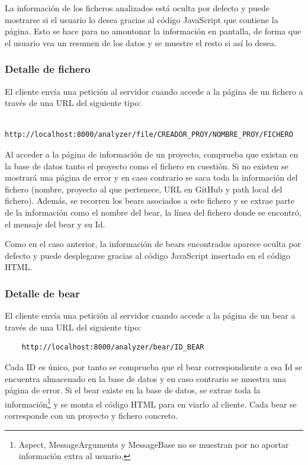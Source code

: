 \documentclass[a4paper, 12pt]{book}
\begin{document}
La información de los ficheros analizados está oculta por defecto y puede mostrarse si el usuario lo desea gracias al código JavaScript que contiene la página. Esto se hace para no amontonar la información en pantalla, de forma que el usuario vea un resumen de los datos y se muestre el resto si así lo desea.

\subsubsection{Detalle de fichero}
\label{sec:section12.4.2}
El cliente envía una petición al servidor cuando accede a la página de un fichero a través de una URL del siguiente tipo:

{\footnotesize
\begin{verbatim}
    http://localhost:8000/analyzer/file/CREADOR_PROY/NOMBRE_PROY/FICHERO
\end{verbatim}
}

Al acceder a la página de información de un proyecto, comprueba que existan en la base de datos tanto el proyecto como el fichero en cuestión. Si no existen se mostrará una página de error y en caso contrario se saca toda la información del fichero (nombre, proyecto al que pertenece, URL en GitHub y path local del fichero). Además, se recorren los bears asociados a este fichero y se extrae parte de la información como el nombre del bear, la línea del fichero donde se encontró, el mensaje del bear y su Id.

Como en el caso anterior, la información de bears encontrados aparece oculta por defecto y puede desplegarse gracias al código JavaScript insertado en el código HTML.

\subsubsection{Detalle de bear}
\label{sec:section12.4.3}
El cliente envía una petición al servidor cuando accede a la página de un bear a través de una URL del siguiente tipo:

{\footnotesize
\begin{verbatim}
    http://localhost:8000/analyzer/bear/ID_BEAR
\end{verbatim}
}

Cada ID es único, por tanto se comprueba que el bear correspondiente a esa Id se encuentra almacenado en la base de datos y en caso contrario se muestra una página de error. Si el bear existe en la base de datos, se extrae toda la información\footnote{Aspect, MessageArguments y MessageBase no se muestran por no aportar información extra al usuario.} y se monta el código HTML para en viarlo al cliente. Cada bear se corresponde con un proyecto y fichero concreto.
\end{document}
